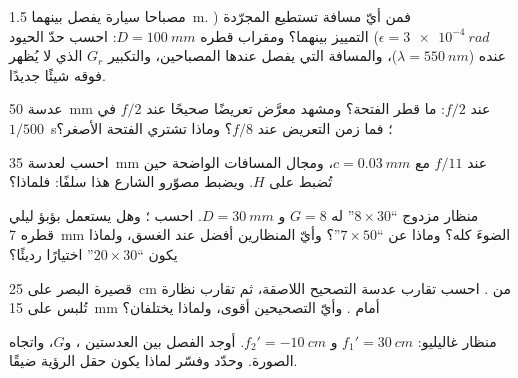 \begin{exercise}[$\star\star$]\label{exo:b1:optical-instruments:6}
مصباحا سيارة يفصل بينهما \qty{1.5}{m}. فمن أيّ مسافة تستطيع
 المجرّدة ($\epsilon = \qty{3e-4}{rad}$) التمييز بينهما؟ ومقراب
قطره $D = \qty{100}{mm}$: احسب حدّ الحيود عنده ($\lambda =
\qty{550}{nm}$)، والمسافة التي يفصل عندها المصباحين،
والتكبير $G_r$ الذي لا يُظهر فوقه شيئًا جديدًا.
\end{exercise}

\begin{exercise}[$\star\star$]\label{exo:b1:optical-instruments:7}
عدسة \qty{50}{mm} عند $f/2$: ما قطر الفتحة؟ ومشهد
معرَّض تعريضًا صحيحًا عند $f/2$ في $1/500$~\unit{s}؛ فما زمن التعريض عند
$f/8$؟ وماذا تشتري الفتحة الأصغر؟
\end{exercise}

\begin{exercise}[$\star\star$]\label{exo:b1:optical-instruments:8}
احسب  لعدسة \qty{35}{mm} عند $f/11$ مع
$c = \qty{0.03}{mm}$، ومجال المسافات الواضحة حين تُضبط
على $H$. ويضبط مصوّرو الشارع هذا سلفًا: فلماذا؟
\end{exercise}

\begin{exercise}[$\star\star$]\label{exo:b1:optical-instruments:9}
منظار مزدوج ``$8\times30$'' له $G = 8$ و $D = \qty{30}{mm}$. احسب
؛ وهل يستعمل بؤبؤ ليلي قطره \qty{7}{mm} الضوءَ كله؟ وماذا عن
``$7\times50$''؟ وأيّ المنظارين أفضل عند الغسق، ولماذا يكون ``$20\times30$''
اختيارًا رديئًا؟
\end{exercise}

\begin{exercise}[$\star\star\star$]\label{exo:b1:optical-instruments:10}
  قصيرة البصر على \qty{25}{cm} من . احسب تقارب
عدسة التصحيح اللاصقة، ثم تقارب نظارة تُلبس على
\qty{15}{mm} أمام . وأيّ التصحيحين أقوى، ولماذا
يختلفان؟
\end{exercise}

\begin{exercise}[$\star\star\star$]\label{exo:b1:optical-instruments:11}
منظار غاليليو: $f_1' = \qty{30}{cm}$ و $f_2' = \qty{-10}{cm}$. أوجد
الفصل بين العدستين ، و$G$، واتجاه
الصورة. وحدّد  وفسّر لماذا يكون حقل الرؤية ضيقًا.
\end{exercise}

